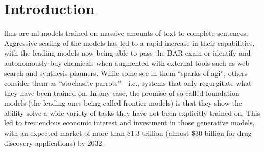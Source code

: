 \documentclass[11pt, oneside]{article}
\begin{document}
\section{Introduction}
\Glspl{llm} are \gls{ml} models trained on massive amounts of text to complete sentences. 
Aggressive scaling of the models has led to a rapid increase in their capabilities,\cite{brown2020language} with the leading models now being able to pass the BAR exam or identify and autonomously buy chemicals when augmented with external tools such as web search and synthesis planners.\cite{openai2024gpt4}
While some see in them \enquote{sparks of \gls{agi}},\cite{bubeck2023sparks} others consider them as \enquote{stochasitc parrots}---i.e., systems that only regurgitate what they have been trained on.\cite{bender2021dangers}
In any case, the promise of so-called foundation models (the leading ones being called frontier models) is that they show the ability solve a wide variety of tasks they have not been explicitly trained on.\cite{bommasani2021opportunities, anderljung2023frontier}
This led to tremendous economic interest and investment in those generative models, with an expected market of more than \$1.3 trillion (almost \$30 billion for drug discovery applications) by 2032.\cite{bloomberg}
\end{document}
